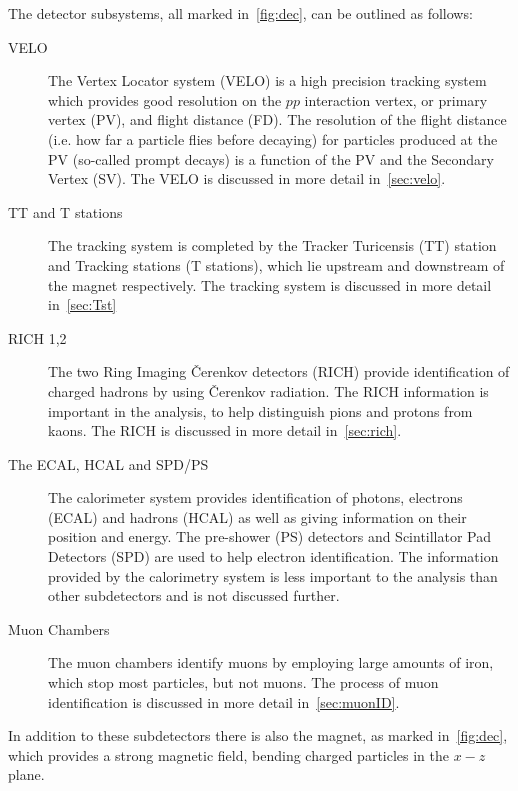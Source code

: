 The detector subsystems, all marked in~\autoref{fig:dec}, can be outlined as follows:
\begin{description}
\item [VELO] The Vertex Locator system (\Gls{VELO}) is a high precision tracking system which provides good resolution on the $pp$ interaction vertex, or primary vertex (\Gls{PV}), and flight distance (\Gls{FD}). The resolution of the flight distance (i.e. how far a particle flies before decaying) for particles produced at the PV (so-called \gls{prompt} decays) is a function of the PV and the Secondary Vertex (SV). The VELO is discussed in more detail in~\autoref{sec:velo}.
\item [TT and T stations] The tracking system is completed by the Tracker Turicensis (TT) station and Tracking stations (T stations), which lie upstream and downstream of the magnet respectively. The tracking system is discussed in more detail in~\autoref{sec:Tst} %
\item [RICH 1,2] The two Ring Imaging \v{C}erenkov detectors (\Gls{RICH}) provide identification of charged hadrons by using \v{C}erenkov radiation. The RICH information is important in the \Lbpi analysis, to help distinguish pions and protons from kaons. The RICH is discussed in more detail in~\autoref{sec:rich}.
\item [The ECAL, HCAL and SPD/PS] The calorimeter system provides identification of photons, electrons (\Gls{ECAL}) and hadrons (\Gls{HCAL}) as well as giving information on their position and energy. The pre-shower (\Gls{PS}) detectors and Scintillator Pad Detectors (\Gls{SPD}) are used to help electron identification. The information provided by the calorimetry system is less important to the \Lbpi analysis than other subdetectors and is not discussed further.
\item [Muon Chambers]  The muon chambers identify muons by employing large amounts of iron, which stop most particles, but not muons. The process of muon identification is discussed in more detail in~\autoref{sec:muonID}.
\end{description}

In addition to these subdetectors there is also the magnet, as marked in~\autoref{fig:dec}, which provides a strong magnetic field, bending charged particles in the $x - z$ plane. %

